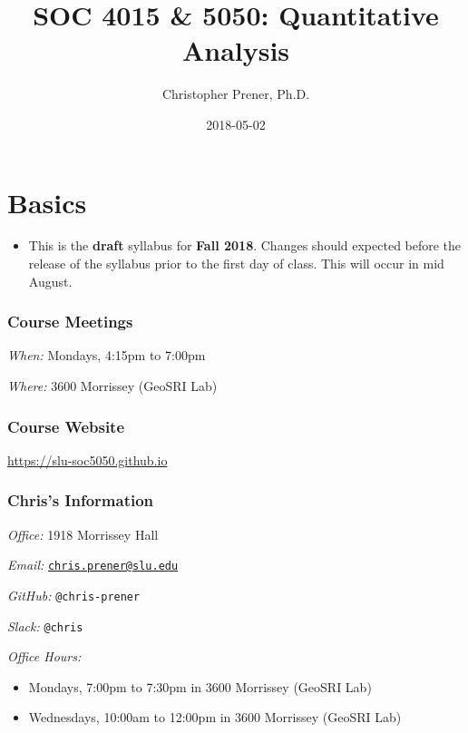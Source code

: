 \documentclass[]{book}
\title{SOC 4015 \& 5050: Quantitative Analysis}
\author{Christopher Prener, Ph.D.}
\date{2018-05-02}
\newenvironment{rmdblock}[1]
  {\begin{shaded*}
  \begin{itemize}
  \renewcommand{\labelitemi}{
    \raisebox{-.7\height}[0pt][0pt]{
      {\setkeys{Gin}{width=3em,keepaspectratio}\texttt{[image: images/\#1]}}
    }
  }
  \item
  }
  {
  \end{itemize}
  \end{shaded*}
  }
\newenvironment{rmdwarning}
  {\begin{rmdblock}{warning}}
  {\end{rmdblock}}
\theoremstyle{definition}
\theoremstyle{definition}
\theoremstyle{definition}
\theoremstyle{remark}
\begin{document}
\maketitle

{
\setcounter{tocdepth}{1}
\tableofcontents
}
\chapter*{Basics}\label{basics}

\begin{rmdwarning}
This is the \textbf{draft} syllabus for \textbf{Fall 2018}. Changes
should expected before the release of the syllabus prior to the first
day of class. This will occur in mid August.
\end{rmdwarning}

\subsection*{Course Meetings}\label{course-meetings}

\emph{When:} Mondays, 4:15pm to 7:00pm

\emph{Where:} 3600 Morrissey (GeoSRI Lab)

\subsection*{Course Website}\label{course-website}

\url{https://slu-soc5050.github.io}

\subsection*{Chris's Information}\label{chriss-information}

\emph{Office:} 1918 Morrissey Hall

\emph{Email:}
\href{mailto:chris.prener@slu.edu}{\nolinkurl{chris.prener@slu.edu}}

\emph{GitHub:} \texttt{@chris-prener}

\emph{Slack:} \texttt{@chris}

\emph{Office Hours:}

\begin{itemize}
\item
  Mondays, 7:00pm to 7:30pm in 3600 Morrissey (GeoSRI Lab)
\item
  Wednesdays, 10:00am to 12:00pm in 3600 Morrissey (GeoSRI Lab)
\end{itemize}
\end{document}
